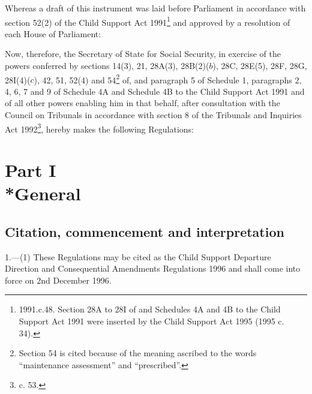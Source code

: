 \documentclass[12pt,a4paper]{article}
\title{\regstitle}
\author{S.I. 1996 No. 2907}
\date{Made 20th November 1996\\Coming into force 2nd December 1996}
\begin{document}
\maketitle

\noindent
Whereas a draft of this instrument was laid before Parliament in accordance with
section 52(2) of the Child Support Act 1991\footnote{\frenchspacing 1991.c.48.
Section 28A to 28I of and Schedules 4A and 4B to the Child Support Act 1991 were
inserted by the Child Support Act 1995 (1995 c. 34).} and approved by a
resolution of each House of Parliament:

Now, therefore, the Secretary of State for Social Security, in exercise of the
powers conferred by sections 14(3), 21, 28A(3), 28B(2)($b$), 28C, 28E(5), 28F,
28G, 28I(4)($c$), 42, 51, 52(4) and 54\footnote{\frenchspacing Section 54 is cited
because of the meaning ascribed to the words “maintenance assessment” and
“prescribed”.} of, and paragraph 5 of Schedule 1, paragraphs 2, 4, 6, 7 and 9 of
Schedule 4A and Schedule 4B to the Child Support Act 1991 and of all other
powers enabling him in that behalf, after consultation with the Council on
Tribunals in accordance with section 8 of the Tribunals and Inquiries Act
1992\footnote{ c. 53.}, hereby makes the following
Regulations:

{\sloppy

\tableofcontents

}

\setcounter{secnumdepth}{-2}

\section[Part I --- General]{Part I\\*General}

\subsection[1. Citation, commencement and interpretation]{Citation, commencement and interpretation}

\renewcommand\parthead{--- Part I}

1.—(1) These Regulations
may be cited as the Child Support Departure Direction and Consequential
Amendments Regulations 1996 and shall come into force on 2nd December 1996.
\end{document}
